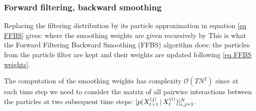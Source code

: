\subsubsection{Forward filtering, backward smoothing}
Replacing the filtering distribution by its particle approximation in equation \eqref{eq FFBS} gives:
where the smoothing weights are given recursively by
This is what the Forward Filtering Backward Smoothing (FFBS) algorithm does: the particles from the particle filter are kept and their weights are updated following \eqref{eq FFBS weights}. 

The computation of the smoothing weights has complexity $\mathcal O(TN^{2})$ since at each time step we need to consider the matrix of all pairwise interactions between the particles at two subsequent time steps: $[p(X^{(j)}_{t+1}\,|\, X^{(i)}_{t})]_{i,j=1}^{N}$.

